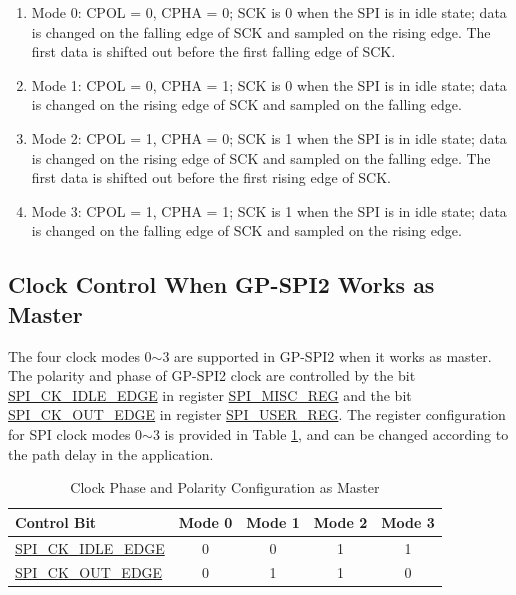 \documentclass[main\_\_EN.tex]{subfiles}
\begin{document}
\begin{enumerate}
    \item Mode 0: CPOL = 0, CPHA = 0; SCK is 0 when the SPI is in idle state; data is changed on the falling edge of SCK and sampled on the rising edge. The first data is shifted out before the first falling edge of SCK.
    \item Mode 1: CPOL = 0, CPHA = 1; SCK is 0 when the SPI is in idle state; data is changed on the rising edge of SCK and sampled on the falling edge.
    \item Mode 2: CPOL = 1, CPHA = 0; SCK is 1 when the SPI is in idle state; data is changed on the rising edge of SCK and sampled on the falling edge. The first data is shifted out before the first rising edge of SCK.
    \item Mode 3: CPOL = 1, CPHA = 1; SCK is 1 when the SPI is in idle state; data is changed on the falling edge of SCK and sampled on the rising edge.
\end{enumerate}


\subsection{Clock Control When GP-SPI2 Works as Master}\label{GP-SPI2 master clock control}

The four clock modes 0$\sim$3 are supported in GP-SPI2 when it works as master. The polarity and phase of GP-SPI2 clock are controlled by the bit \hyperref[fielddesc:SPICKIDLEEDGE]{SPI\_CK\_IDLE\_EDGE} in register \hyperref[regdesc:SPIMISCREG]{SPI\_MISC\_REG} and the bit \hyperref[fielddesc:SPICKOUTEDGE]{SPI\_CK\_OUT\_EDGE} in register \hyperref[regdesc:SPIUSERREG]{SPI\_USER\_REG}. The register configuration for SPI clock modes 0$\sim$3 is provided in Table \ref{table:clock_pol_master}, and can be changed according to the path delay in the application.

\begin{table}[H]
    \centering
    \caption{Clock Phase and Polarity Configuration as Master}
    \label{table:clock_pol_master}
    \begin{tabular}[c]{|p{3.5cm}|c|c|c|c|}
    \hline
    \rowcolor{lightgray}
    \textbf{Control Bit} & \textbf{Mode 0} & \textbf{Mode 1} & \textbf{Mode 2} & \textbf{Mode 3}\\
    \hline
   \hyperref[fielddesc:SPICKIDLEEDGE]{SPI\_CK\_IDLE\_EDGE}  & 0     & 0     & 1     & 1\\
    \hline
   \hyperref[fielddesc:SPICKOUTEDGE]{SPI\_CK\_OUT\_EDGE}   & 0     & 1     & 1     & 0\\
    \hline
    \end{tabular}
\end{table}
\end{document}
